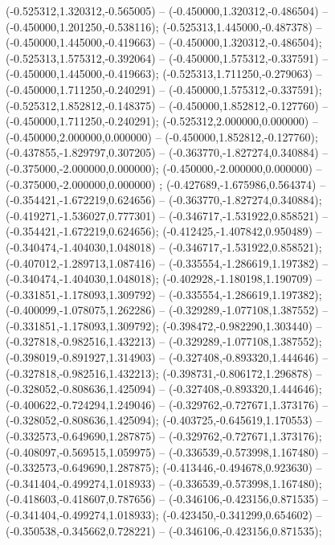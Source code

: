  (-0.525312,1.320312,-0.565005) -- (-0.450000,1.320312,-0.486504) -- (-0.450000,1.201250,-0.538116);
 (-0.525313,1.445000,-0.487378) -- (-0.450000,1.445000,-0.419663) -- (-0.450000,1.320312,-0.486504);
 (-0.525313,1.575312,-0.392064) -- (-0.450000,1.575312,-0.337591) -- (-0.450000,1.445000,-0.419663);
 (-0.525313,1.711250,-0.279063) -- (-0.450000,1.711250,-0.240291) -- (-0.450000,1.575312,-0.337591);
 (-0.525312,1.852812,-0.148375) -- (-0.450000,1.852812,-0.127760) -- (-0.450000,1.711250,-0.240291);
 (-0.525312,2.000000,0.000000) -- (-0.450000,2.000000,0.000000) -- (-0.450000,1.852812,-0.127760);
 (-0.437855,-1.829797,0.307205) -- (-0.363770,-1.827274,0.340884) -- (-0.375000,-2.000000,0.000000);
 (-0.450000,-2.000000,0.000000) -- (-0.375000,-2.000000,0.000000) ;
 (-0.427689,-1.675986,0.564374) -- (-0.354421,-1.672219,0.624656) -- (-0.363770,-1.827274,0.340884);
 (-0.419271,-1.536027,0.777301) -- (-0.346717,-1.531922,0.858521) -- (-0.354421,-1.672219,0.624656);
 (-0.412425,-1.407842,0.950489) -- (-0.340474,-1.404030,1.048018) -- (-0.346717,-1.531922,0.858521);
 (-0.407012,-1.289713,1.087416) -- (-0.335554,-1.286619,1.197382) -- (-0.340474,-1.404030,1.048018);
 (-0.402928,-1.180198,1.190709) -- (-0.331851,-1.178093,1.309792) -- (-0.335554,-1.286619,1.197382);
 (-0.400099,-1.078075,1.262286) -- (-0.329289,-1.077108,1.387552) -- (-0.331851,-1.178093,1.309792);
 (-0.398472,-0.982290,1.303440) -- (-0.327818,-0.982516,1.432213) -- (-0.329289,-1.077108,1.387552);
 (-0.398019,-0.891927,1.314903) -- (-0.327408,-0.893320,1.444646) -- (-0.327818,-0.982516,1.432213);
 (-0.398731,-0.806172,1.296878) -- (-0.328052,-0.808636,1.425094) -- (-0.327408,-0.893320,1.444646);
 (-0.400622,-0.724294,1.249046) -- (-0.329762,-0.727671,1.373176) -- (-0.328052,-0.808636,1.425094);
 (-0.403725,-0.645619,1.170553) -- (-0.332573,-0.649690,1.287875) -- (-0.329762,-0.727671,1.373176);
 (-0.408097,-0.569515,1.059975) -- (-0.336539,-0.573998,1.167480) -- (-0.332573,-0.649690,1.287875);
 (-0.413446,-0.494678,0.923630) -- (-0.341404,-0.499274,1.018933) -- (-0.336539,-0.573998,1.167480);
 (-0.418603,-0.418607,0.787656) -- (-0.346106,-0.423156,0.871535) -- (-0.341404,-0.499274,1.018933);
 (-0.423450,-0.341299,0.654602) -- (-0.350538,-0.345662,0.728221) -- (-0.346106,-0.423156,0.871535);
